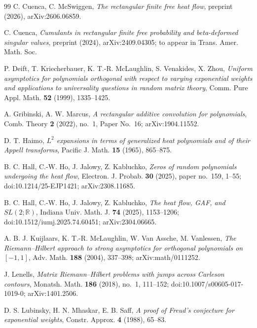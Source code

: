 \documentclass[11pt]{amsart}
\theoremstyle{definition}
\theoremstyle{remark}
\numberwithin{equation}{section}
\begin{document}
\begin{thebibliography}{99}
 C. Cuenca, C. McSwiggen, \emph{The rectangular finite free heat flow}, preprint (2026), arXiv:2606.06859.

 C. Cuenca, \emph{Cumulants in rectangular finite free probability and beta-deformed singular values}, preprint (2024), arXiv:2409.04305; to appear in Trans. Amer. Math. Soc.

 P. Deift, T. Kriecherbauer, K. T.-R. McLaughlin, S. Venakides, X. Zhou, \emph{Uniform asymptotics for polynomials orthogonal with respect to varying exponential weights and applications to universality questions in random matrix theory}, Comm. Pure Appl. Math. \textbf{52} (1999), 1335--1425.

 A. Gribinski, A. W. Marcus, \emph{A rectangular additive convolution for polynomials}, Comb. Theory \textbf{2} (2022), no.~1, Paper No.~16; arXiv:1904.11552.

 D. T. Haimo, \emph{$L^2$ expansions in terms of generalized heat polynomials and of their Appell transforms}, Pacific J. Math. \textbf{15} (1965), 865--875.

 B. C. Hall, C.-W. Ho, J. Jalowy, Z. Kabluchko, \emph{Zeros of random polynomials undergoing the heat flow}, Electron. J. Probab. \textbf{30} (2025), paper no.~159, 1--55; doi:10.1214/25-EJP1421; arXiv:2308.11685.

 B. C. Hall, C.-W. Ho, J. Jalowy, Z. Kabluchko, \emph{The heat flow, GAF, and $SL(2;\mathbb R)$}, Indiana Univ. Math. J. \textbf{74} (2025), 1153--1206; doi:10.1512/iumj.2025.74.60451; arXiv:2304.06665.

 A. B. J. Kuijlaars, K. T.-R. McLaughlin, W. Van Assche, M. Vanlessen, \emph{The Riemann--Hilbert approach to strong asymptotics for orthogonal polynomials on $[-1,1]$}, Adv. Math. \textbf{188} (2004), 337--398; arXiv:math/0111252.

 J. Lenells, \emph{Matrix Riemann--Hilbert problems with jumps across Carleson contours}, Monatsh. Math. \textbf{186} (2018), no.~1, 111--152; doi:10.1007/s00605-017-1019-0; arXiv:1401.2506.

 D. S. Lubinsky, H. N. Mhaskar, E. B. Saff, \emph{A proof of Freud's conjecture for exponential weights}, Constr. Approx. \textbf{4} (1988), 65--83.


\end{thebibliography}
\end{document}
